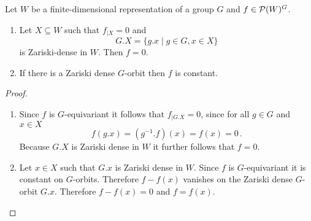\begin{lem}\label{lem: zariski density orbits}
  Let $W$ be a finite-dimensional representation of a group $G$ and $f \in \mathcal{P}(W)^G$.
  \begin{enumerate}[label=\emph{\alph*)},leftmargin=*]
    \item
      Let $X \subseteq W$ such that $f_{|X} = 0$ and
      \[
          G.X
        = \{
            g.x
          \mid
            g \in G,
            x \in X
          \}
      \]
      is Zariski-dense in $W$.
      Then $f = 0$.
    \item
      If there is a Zariski dense $G$-orbit then $f$ is constant.
  \end{enumerate}
\end{lem}
\begin{proof}
  \begin{enumerate}[label=\emph{\alph*)},leftmargin=*]
    \item
      Since $f$ is $G$-equivariant it follows that $f_{|G.X} = 0$, since for all $g \in G$ and $x \in X$
      \[
          f(g.x)
        = \left( g^{-1}.f \right)(x)
        = f(x)
        = 0 \,.
      \]
      Because $G.X$ is Zariski dense in $W$ it further follows that $f = 0$.
    \item
      Let $x \in X$ such that $G.x$ is Zariski dense in $W$.
      Since $f$ is $G$-equivariant it is constant on $G$-orbits.
      Therefore $f - f(x)$ vanishes on the Zariski dense $G$-orbit $G.x$.
      Therefore $f - f(x) = 0$ and $f = f(x)$.
    \qedhere
  \end{enumerate}
\end{proof}


